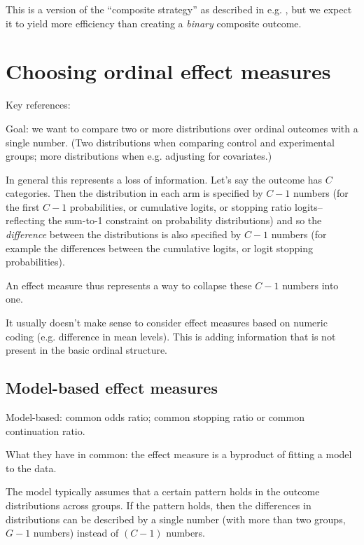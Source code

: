 \documentclass[
  11pt,
  fleqn
]{article}
\begin{document}
This is a version of the ``composite strategy'' as described in e.g.
\citet{kahanEstimandsFrameworkPrimer2024}, but we expect it to yield
more efficiency than creating a \emph{binary} composite outcome.

\section{Choosing ordinal effect measures}

Key references:
\citet{agrestiMeasuresNominalOrdinalAssociation1981,agrestiOrdinalProbabilityEffect2017a,
agrestiSimpleWaysInterpret2018a}

Goal: we want to compare two or more distributions over ordinal
outcomes with a single number. (Two distributions when comparing control and
experimental groups; more distributions when e.g. adjusting for covariates.)

In general this represents a loss of information. Let's say the
outcome has $C$ categories. Then the distribution in each
arm is specified by $C-1$ numbers (for the first $C-1$ probabilities,
  or cumulative logits, or stopping ratio logits--reflecting the
sum-to-1 constraint on probability distributions) and so the
\emph{difference} between the distributions is also specified by
$C-1$ numbers (for example the differences between the cumulative
logits, or logit stopping probabilities).

An effect measure thus represents a way to collapse these $C-1$
numbers into one.

It usually doesn't make sense to consider effect measures based on
numeric coding (e.g. difference in mean levels). This is adding
information that is not present in the basic ordinal structure.

\subsection{Model-based effect measures}

Model-based: common odds ratio; common stopping ratio or common continuation
ratio.

What they have in common: the effect measure is a byproduct of fitting a model
to the data.

The model typically assumes that a certain pattern holds in the outcome
distributions across groups. If the pattern holds, then the differences in
distributions can be described by a single number (with more than two groups,
$G-1$ numbers) instead of $(C-1)$ numbers.
\end{document}
